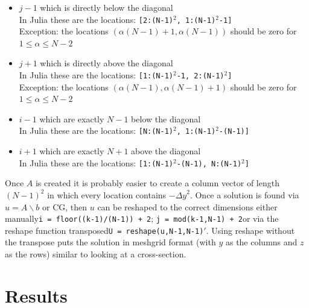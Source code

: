 \documentclass[11pt]{article}
\begin{document}
	\begin{itemize}
		\item $ j-1 $ which is directly below the diagonal\\
		In Julia these are the locations: \texttt{\footnotesize[2:(N-1)$^2$, 1:(N-1)$^2$-1]}\\
		Exception: the locations $ (\alpha(N-1) + 1,\alpha(N-1)) $ should be zero for $ 1\leq\alpha\leq N-2 $ 
		\item $ j+1 $ which is directly above the diagonal\\
		In Julia these are the locations: \texttt{\footnotesize[1:(N-1)$^2$-1, 2:(N-1)$^2$]}\\
		Exception: the locations $ (\alpha(N-1),\alpha(N-1)+1) $ should be zero for $ 1\leq\alpha\leq N-2 $ 
		\item $ i-1 $ which are exactly $ N-1 $ below the diagonal\\
		In Julia these are the locations: \texttt{\footnotesize[N:(N-1)$^2$, 1:(N-1)$^2$-(N-1)]}
		\item $ i+1 $ which are exactly $ N+1 $ above the diagonal\\
		In Julia these are the locations: \texttt{\footnotesize[1:(N-1)$^2$-(N-1), N:(N-1)$^2$]}
	\end{itemize}
	Once $ A $ is created it is probably easier to create a column vector of length $ (N-1)^2 $ in which every location contains $ -{\Delta y}^2 $. Once a solution is found via $ u = A\backslash b $ or CG, then $ u $ can be reshaped to the correct dimensions either manually\textemdash \texttt{\footnotesize i = floor((k-1)/(N-1)) + 2}; \texttt{\footnotesize j = mod(k-1,N-1) + 2}\textemdash or via the reshape function transposed\textemdash \texttt{\footnotesize U = reshape(u,N-1,N-1)$'$}. Using reshape without the transpose puts the solution in meshgrid format (with $ y $ as the columns and $ z $ as the rows) similar to looking at a cross-section.\\
	
	\section{Results}
\end{document}
